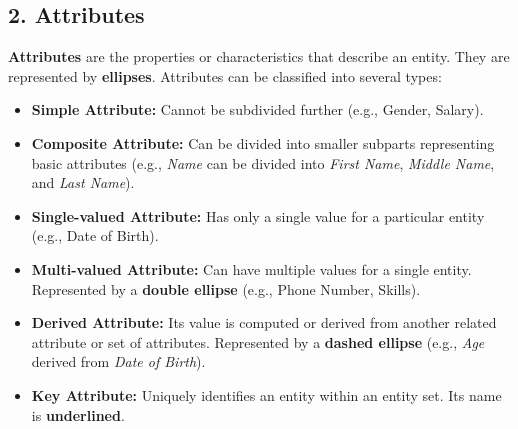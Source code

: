 \documentclass[12pt,a3paper]{article}
\begin{document}
\begin{enumerate}
\begin{tcolorbox}[enhanced,breakable,ansbox,colback=cA!4,colframe=cA,boxrule=0.8pt,arc=5pt,title={\textbf{Answer}},fonttitle=\bfseries\color{white},colbacktitle=cA]
\subsection*{2. Attributes}
\textbf{Attributes} are the properties or characteristics that describe an entity. They are represented by \textbf{ellipses}. Attributes can be classified into several types:
\begin{itemize}
    \item \textbf{Simple Attribute:} Cannot be subdivided further (e.g., Gender, Salary).
    \item \textbf{Composite Attribute:} Can be divided into smaller subparts representing basic attributes (e.g., \textit{Name} can be divided into \textit{First Name}, \textit{Middle Name}, and \textit{Last Name}).
    \item \textbf{Single-valued Attribute:} Has only a single value for a particular entity (e.g., Date of Birth).
    \item \textbf{Multi-valued Attribute:} Can have multiple values for a single entity. Represented by a \textbf{double ellipse} (e.g., Phone Number, Skills).
    \item \textbf{Derived Attribute:} Its value is computed or derived from another related attribute or set of attributes. Represented by a \textbf{dashed ellipse} (e.g., \textit{Age} derived from \textit{Date of Birth}).
    \item \textbf{Key Attribute:} Uniquely identifies an entity within an entity set. Its name is \textbf{underlined}.
\end{itemize}


\end{tcolorbox}
\end{enumerate}
\end{document}
